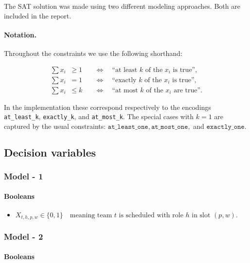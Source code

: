 \documentclass{article}
\begin{document}
The SAT solution was made using two different modeling approaches. Both are included in the report. 

\paragraph{Notation.}
Throughout the constraints we use the following shorthand:

\[
\begin{aligned}
\sum x_i \;\;\geq 1 &\quad\Longleftrightarrow\quad \text{``at least $k$ of the $x_i$ is true''}, \\[6pt]
\sum x_i \;\;= 1   &\quad\Longleftrightarrow\quad \text{``exactly $k$ of the $x_i$ is true''}, \\[6pt]
\sum x_i \;\;\leq k &\quad\Longleftrightarrow\quad \text{``at most $k$ of the $x_i$ are true''}.
\end{aligned}
\]

In the implementation these correspond respectively to the encodings 
\texttt{at\_least\_k}, \texttt{exactly\_k}, and \texttt{at\_most\_k}. The special cases with $k=1$ are captured by the usual constraints:
$ \texttt{at\_least\_one}, 
\texttt{at\_most\_one}, $ and $ 
\texttt{exactly\_one}.
$


\subsection{Decision variables}

\subsubsection{Model - 1}

\paragraph{Booleans}

\begin{itemize}
    \item  $ X_{t,h,p,w}\in\{0,1\} \quad\text{meaning team }t\text{ is scheduled with role }h\text{ in slot }(p,w). $
\end{itemize}

\subsubsection{Model - 2}

\paragraph{Booleans}
\end{document}
